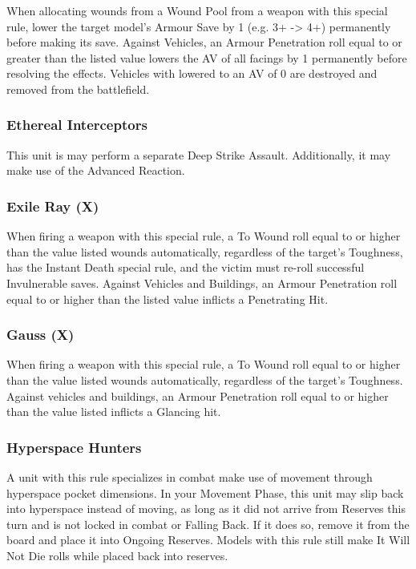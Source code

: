 \begin{multicols}{2}
When allocating wounds from a Wound Pool from a weapon with this special rule, lower the target model's Armour Save by 1 (e.g. 3+ -> 4+) permanently before making its save. Against Vehicles, an Armour Penetration roll equal to or greater than the listed value lowers the AV of all facings by 1 permanently before resolving the effects. Vehicles with lowered to an AV of 0 are destroyed and removed from the battlefield.

\subsubsection{Ethereal Interceptors} \label{Ethereal Interceptors}

This unit is may perform a separate Deep Strike Assault. Additionally, it may make use of the  Advanced Reaction.

\subsubsection{Exile Ray (X)} \label{Exile Ray}

When firing a weapon with this special rule, a To Wound roll equal to or higher than the value listed wounds automatically, regardless of the target's Toughness, has the Instant Death special rule, and the victim must re-roll successful Invulnerable saves. Against Vehicles and Buildings, an Armour Penetration roll equal to or higher than the listed value inflicts a Penetrating Hit.

\subsubsection{Gauss (X)} \label{Gauss}

When firing a weapon with this special rule, a To Wound roll equal to or higher than the value listed wounds automatically, regardless of the target’s Toughness. Against vehicles and buildings, an Armour Penetration roll equal to or higher than the value listed inflicts a Glancing hit.

\subsubsection{Hyperspace Hunters} \label{Hyperspace Hunters}

A unit with this rule specializes in combat make use of movement through hyperspace pocket dimensions. In your Movement Phase, this unit may slip back into hyperspace instead of moving, as long as it did not arrive from Reserves this turn and is not locked in combat or Falling Back. If it does so, remove it from the board and place it into Ongoing Reserves. Models with this rule still make It Will Not Die rolls while placed back into reserves.


\end{multicols}
